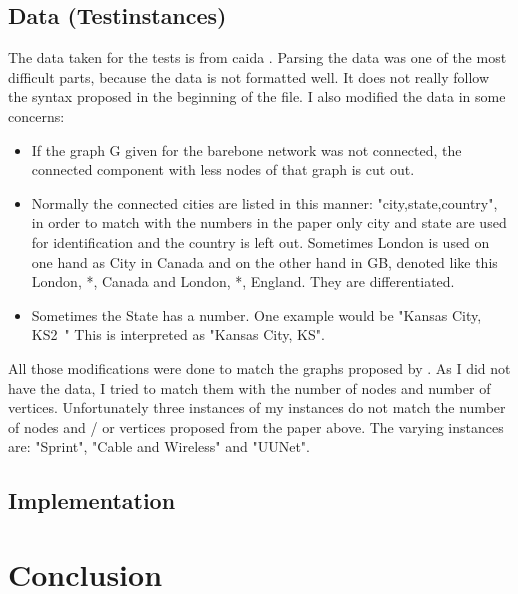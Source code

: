 \documentclass [12pt]{article}
\begin{document}
    \subsection{Data (Testinstances)}
    The data taken for the tests is from caida \cite{caidabarebones}. Parsing the
    data was one of the most difficult parts, because the data is not formatted well.
    It does not really follow the syntax proposed in the beginning of the file. I also
    modified the data in some concerns:
    \begin{itemize}
        \item If the graph G given for the barebone network was not connected,
            the connected component with less nodes of that graph is cut out.
            
        \item Normally the connected cities are listed in this manner:
            "city,state,country", in order to match with the numbers 
            in the paper \cite{mirrorserver} only city and state are used for
            identification and the country is left out. Sometimes London
            is used on one hand as City in Canada and on the other hand in GB, denoted like this
            London, *, Canada and London, *, England. They are differentiated.
        \item Sometimes the State has a number. One example would be "Kansas City, KS2~"
            This is interpreted as "Kansas City, KS".

    \end{itemize}

        All those modifications were done to match the graphs proposed by \cite{mirrorserver}.
        As I did not have the data, I tried to match them with the number of
        nodes and number of vertices. Unfortunately three instances of my instances do not
        match the number of nodes and / or vertices proposed from the paper above.
        The varying instances are: "Sprint", "Cable and Wireless" and "UUNet".
         
    \subsection{Implementation}
\section{Conclusion}



\end{document}
